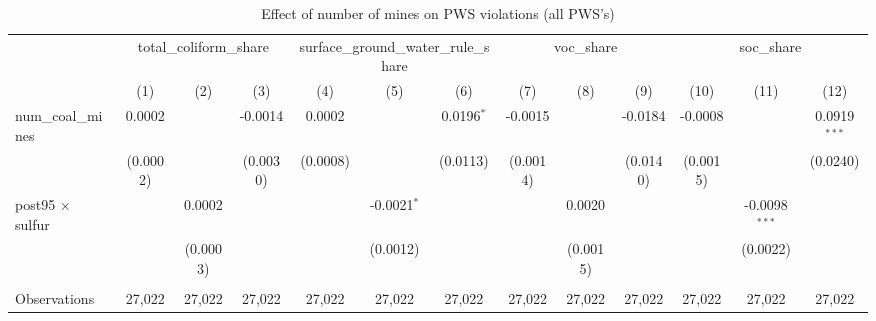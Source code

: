 
\begin{table}[htbp]
   \caption{\label{olsrf2sls_nummine_nonmine_vio_1985to2005allhucs} Effect of number of mines on PWS violations (all PWS's)}
   \bigskip
   \centering
   \begin{adjustbox}{width = \textwidth, center}
      \begin{tabular}{lcccccccccccc}
         \toprule
          & \multicolumn{3}{c}{total\_coliform\_share} & \multicolumn{3}{c}{surface\_ground\_water\_rule\_share} & \multicolumn{3}{c}{voc\_share} & \multicolumn{3}{c}{soc\_share}\\
                                                & (1)                   & (2)                   & (3)                   & (4)                   & (5)           & (6)           & (7)           & (8)           & (9)           & (10)                  & (11)            & (12)\\  
         \midrule 
         num\_coal\_mines                       & 0.0002                &                       & -0.0014               & 0.0002                &               & 0.0196$^{*}$  & -0.0015       &               & -0.0184       & -0.0008               &                 & 0.0919$^{***}$\\   
                                                & (0.0002)              &                       & (0.0030)              & (0.0008)              &               & (0.0113)      & (0.0014)      &               & (0.0140)      & (0.0015)              &                 & (0.0240)\\   
         post95 $\times$ sulfur                 &                       & 0.0002                &                       &                       & -0.0021$^{*}$ &               &               & 0.0020        &               &                       & -0.0098$^{***}$ &   \\   
                                                &                       & (0.0003)              &                       &                       & (0.0012)      &               &               & (0.0015)      &               &                       & (0.0022)        &   \\   
          \\
         Observations                           & 27,022                & 27,022                & 27,022                & 27,022                & 27,022        & 27,022        & 27,022        & 27,022        & 27,022        & 27,022                & 27,022          & 27,022\\  

\end{tabular}
\end{adjustbox}
\end{table}
